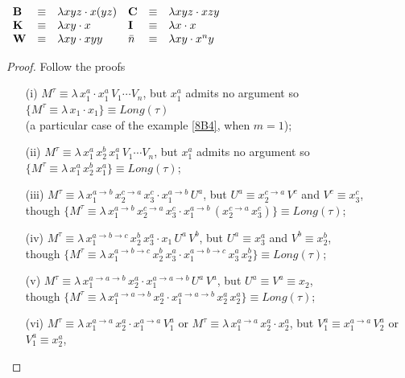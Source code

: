\documentclass[a4paper,10pt]{article}
\begin{document}
\begin{exa}
\begin{center}
$
\begin{array}{lcllcl}
 \mbox{\textbf{B}} & \equiv & \lambda x y z \cdot x (y z) & \mbox{\textbf{C}} & \equiv &  \lambda x y z \cdot x z y \\
 \mbox{\textbf{K}} & \equiv & \lambda x y \cdot x &  \mbox{\textbf{I}} & \equiv & \lambda x \cdot x \\
 \mbox{\textbf{W}} & \equiv & \lambda x y \cdot x y y & \bar{n} & \equiv & \lambda x y\cdot x^n y 
\end{array}
$
\end{center}
\begin{proof} Follow the proofs
 \begin{itemize}
  \item [(i)] $M^{\tau} \equiv \lambda\, x_1^a\cdot x_1^a\,V_1\cdots V_n$, but $x_1^a$ admits no argument so $\{M^{\tau} \equiv \lambda\, x_1\cdot x_1\} \equiv Long(\tau)$\\ 
   (a particular case of the example \ref{8B4}, when $m = 1$);
  \item [(ii)] $M^{\tau} \equiv \lambda\,x_1^a\,x_2^b\,x_1^a\,V_1\cdots V_n$, but $x_1^a$ admits no argument so $\{M^{\tau} \equiv \lambda\,x_1^a\,x_2^b\,x_1^a\} \equiv Long(\tau)$;
  \item [(iii)] $M^{\tau} \equiv \lambda\,x_1^{a\to b}\,x_2^{c\to a}\,x_3^c\cdot x_1^{a\to b}\,U^a$, but $U^a \equiv x_2^{c \to a}\,V^c$ and $V^c \equiv x_3^c$,\\
                though $\{M^{\tau} \equiv   \lambda\,x_1^{a\to b}\,x_2^{c\to a}\,x_3^c\cdot x_1^{a\to b}\,(x_2^{c \to a}\,x_3^c)\} \equiv Long(\tau)$;
  \item [(iv)] $M^{\tau} \equiv \lambda\,x_1^{a\to b\to c}\,x_2^b\,x_3^a\cdot x_1\,U^a\,V^b$, but $U^a\equiv x_3^a$ and $V^b\equiv x_2^b$,\\
                though $\{M^{\tau} \equiv \lambda\,x_1^{a\to b\to c}\,x_2^b\,x_3^a\cdot x_1^{a\to b\to c}\,x_3^a\,x_2^b\} \equiv Long(\tau)$;
  \item [(v)] $M^{\tau} \equiv \lambda\,x_1^{a\to a\to b}\,x_2^a\cdot x_1^{a\to a\to b}\,U^a\,V^a$, but $U^a \equiv V^a \equiv x_2$,\\
		though $\{M^{\tau} \equiv \lambda\,x_1^{a\to a\to b}\,x_2^a\cdot x_1^{a\to a\to b}\,x_2^a\,x_2^a\} \equiv Long(\tau)$;
  \item [(vi)] $M^{\tau} \equiv \lambda\,x_1^{a\to a}\,x_2^a\cdot x_1^{a\to a}\,V_1^a$ or $M^{\tau} \equiv \lambda\,x_1^{a\to a}\,x_2^a\cdot x_2^a$, 
               but $V_1^a \equiv x_1^{a\to a}\,V_2^a$ or $V_1^a \equiv x_2^a$,\\

\end{itemize}
\end{proof}
\end{exa}
\end{document}
